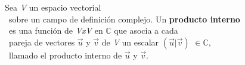 \documentclass[preview]{standalone}
\begin{document}
\begin{center}
Sea \textit{V} un espacio vectorial \\\ sobre un campo de definición complejo. Un \textbf{producto interno} \\\ es una función de \textit{VxV} en $\mathbb{C}$ que asocia a cada \\\ pareja de vectores $\vec{u}$ y $\vec{v}$ de \textit{V} un escalar $(\vec{u} | \vec{v})$ $\in \mathbb{C}$, \\\ llamado el producto interno de  $\vec{u}$ y $\vec{v}$.
\end{center}
\end{document}
